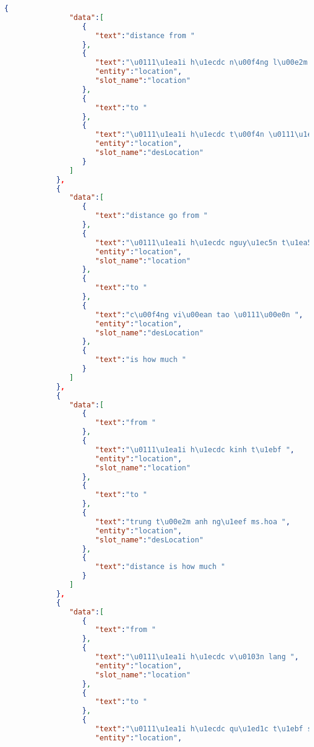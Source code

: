 \begin{lstlisting}[language=json,firstnumber=1]
            {
               "data":[
                  {
                     "text":"distance from "
                  },
                  {
                     "text":"\u0111\u1ea1i h\u1ecdc n\u00f4ng l\u00e2m ",
                     "entity":"location",
                     "slot_name":"location"
                  },
                  {
                     "text":"to "
                  },
                  {
                     "text":"\u0111\u1ea1i h\u1ecdc t\u00f4n \u0111\u1ee9c th\u1eafng ",
                     "entity":"location",
                     "slot_name":"desLocation"
                  }
               ]
            },
            {
               "data":[
                  {
                     "text":"distance go from "
                  },
                  {
                     "text":"\u0111\u1ea1i h\u1ecdc nguy\u1ec5n t\u1ea5t th\u00e0nh ",
                     "entity":"location",
                     "slot_name":"location"
                  },
                  {
                     "text":"to "
                  },
                  {
                     "text":"c\u00f4ng vi\u00ean tao \u0111\u00e0n ",
                     "entity":"location",
                     "slot_name":"desLocation"
                  },
                  {
                     "text":"is how much "
                  }
               ]
            },
            {
               "data":[
                  {
                     "text":"from "
                  },
                  {
                     "text":"\u0111\u1ea1i h\u1ecdc kinh t\u1ebf ",
                     "entity":"location",
                     "slot_name":"location"
                  },
                  {
                     "text":"to "
                  },
                  {
                     "text":"trung t\u00e2m anh ng\u1eef ms.hoa ",
                     "entity":"location",
                     "slot_name":"desLocation"
                  },
                  {
                     "text":"distance is how much "
                  }
               ]
            },
            {
               "data":[
                  {
                     "text":"from "
                  },
                  {
                     "text":"\u0111\u1ea1i h\u1ecdc v\u0103n lang ",
                     "entity":"location",
                     "slot_name":"location"
                  },
                  {
                     "text":"to "
                  },
                  {
                     "text":"\u0111\u1ea1i h\u1ecdc qu\u1ed1c t\u1ebf s\u00e0i g\u00f2n ",
                     "entity":"location",

\end{lstlisting}
